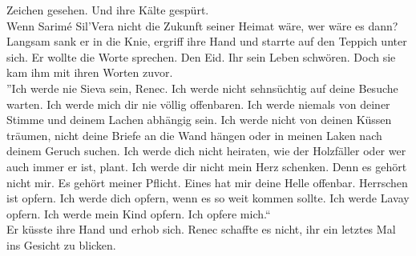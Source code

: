 Zeichen gesehen. Und ihre Kälte gespürt.\\
Wenn Sarimé Sil'Vera nicht die Zukunft seiner Heimat wäre, wer wäre es dann?\\
Langsam sank er in die Knie, ergriff ihre Hand und starrte auf den Teppich unter sich. Er wollte 
die Worte sprechen. Den Eid. Ihr sein Leben schwören. Doch sie kam ihm mit ihren Worten zuvor.\\
''Ich werde nie Sieva sein, Renec. Ich werde nicht sehnsüchtig auf deine Besuche warten. Ich werde 
mich dir nie völlig offenbaren. Ich werde niemals von deiner Stimme und deinem Lachen abhängig 
sein. Ich werde nicht von deinen Küssen träumen, nicht deine Briefe an die Wand hängen oder in 
meinen Laken nach deinem Geruch suchen. Ich werde dich nicht heiraten, wie der Holzfäller oder 
wer auch immer er ist, plant. Ich werde dir nicht mein Herz schenken. Denn es gehört nicht mir. 
Es gehört meiner Pflicht. Eines hat mir deine Helle offenbar. Herrschen ist opfern. Ich werde dich 
opfern, wenn es so weit kommen sollte. Ich werde Lavay opfern. Ich werde mein Kind opfern. Ich 
opfere mich.``\\
Er küsste ihre Hand und erhob sich. Renec schaffte es nicht, ihr ein letztes Mal ins Gesicht zu 
blicken.\\

